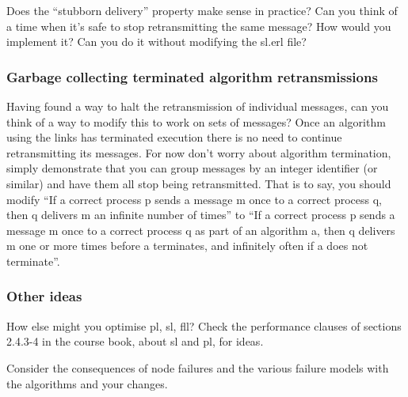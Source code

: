 \documentclass[a4paper]{article}
\begin{document}
Does the ``stubborn delivery'' property make sense in practice? Can you think
of a time when it's safe to stop retransmitting the same message? How would
you implement it? Can you do it without modifying the sl.erl file?


\subsubsection{Garbage collecting terminated algorithm retransmissions} %
\label{ssub:halting_retransmission_on_algorithm_termination}

Having found a way to halt the retransmission of individual messages, can you
think of a way to modify this to work on sets of messages? Once an algorithm
using the links has terminated execution there is no need to continue
retransmitting its messages. For now don't worry about algorithm termination,
simply demonstrate that you can group messages by an integer identifier (or
similar) and have them all stop being retransmitted. That is to say, you
should modify ``If a correct process p sends a message m once to a correct
process q, then q delivers m an infinite number of times'' to ``If a correct
process p sends a message m once to a correct process q as part of an
algorithm a, then q delivers m one or more times before a terminates, and
infinitely often if a does not terminate''.


\subsubsection{Other ideas} %
\label{ssub:other_ideas}

How else might you optimise pl, sl, fll? Check the performance clauses of
sections 2.4.3-4 in the course book, about sl and pl, for ideas.

Consider the consequences of node failures and the various failure models
with the algorithms and your changes.










\end{document}
